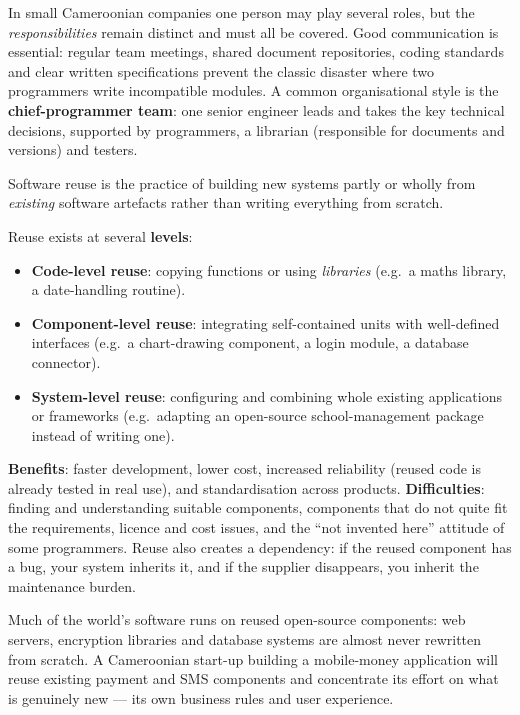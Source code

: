 \documentclass[11pt]{article}
\newcommand{\cle}[1]{{\popxbold\color{popdark}#1}}
\newcounter{popsec}
\newcounter{popsub}
\newcommand{\courssub}[1]{%
  \stepcounter{popsub}%
  \par\vspace{9pt}\noindent{\popxbold\fontsize{11.5}{13}\selectfont\color{popink}{\color{poporange}\thepopsec.\thepopsub}\hspace{6pt}#1}\par\nopagebreak\vspace{4pt}
}
\begin{document}
In small Cameroonian companies one person may play several roles, but the \emph{responsibilities} remain distinct and must all be covered. Good \cle{communication} is essential: regular team meetings, shared document repositories, coding standards and clear written specifications prevent the classic disaster where two programmers write incompatible modules. A common organisational style is the \textbf{chief-programmer team}: one senior engineer leads and takes the key technical decisions, supported by programmers, a librarian (responsible for documents and versions) and testers.

\courssub{Software Reuse}

\begin{definition}
\cle{Software reuse} is the practice of building new systems partly or wholly from \emph{existing} software artefacts rather than writing everything from scratch.
\end{definition}

Reuse exists at several \textbf{levels}:
\begin{itemize}
\item \textbf{Code-level reuse}: copying functions or using \emph{libraries} (e.g.\ a maths library, a date-handling routine).
\item \textbf{Component-level reuse}: integrating self-contained units with well-defined interfaces (e.g.\ a chart-drawing component, a login module, a database connector).
\item \textbf{System-level reuse}: configuring and combining whole existing applications or frameworks (e.g.\ adapting an open-source school-management package instead of writing one).
\end{itemize}

\textbf{Benefits}: faster development, lower cost, increased reliability (reused code is already tested in real use), and standardisation across products. \textbf{Difficulties}: finding and understanding suitable components, components that do not quite fit the requirements, licence and cost issues, and the ``not invented here'' attitude of some programmers. Reuse also creates a dependency: if the reused component has a bug, your system inherits it, and if the supplier disappears, you inherit the maintenance burden.

\begin{savaistu}
Much of the world's software runs on reused open-source components: web servers, encryption libraries and database systems are almost never rewritten from scratch. A Cameroonian start-up building a mobile-money application will reuse existing payment and SMS components and concentrate its effort on what is genuinely new — its own business rules and user experience.
\end{savaistu}
\end{document}
